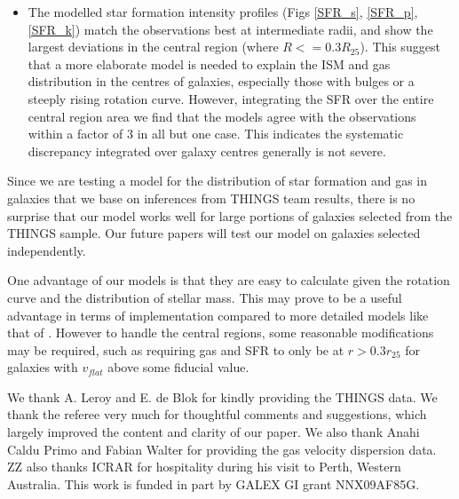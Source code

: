 \documentclass[12pt,preprint]{aastex}
\begin{document}
\begin{itemize}
\item The modelled star formation intensity profiles (Figs \ref{SFR_s}, \ref{SFR_p}, \ref{SFR_k}) match the observations best at intermediate radii, and show the largest deviations in the central region (where $R <= 0.3 R_{25}$).  
This suggest that a more elaborate model is needed to explain the ISM and gas
distribution in the centres of galaxies, especially those with bulges or a steeply rising rotation
curve. However, integrating the SFR over the entire central region area we find that the models agree with the observations within a factor of 3 in all but one case.  This indicates the systematic discrepancy integrated over  galaxy centres generally is not severe.

\end{itemize}

Since we are testing a model for the distribution of star formation and gas in galaxies that we base on inferences from THINGS team results, there is no surprise that our model works well for large portions of galaxies selected from the THINGS sample. Our future papers will test our model on galaxies selected independently.


One advantage of our models is that they are easy to calculate given the rotation curve and the distribution of stellar mass. This may prove to be a useful advantage in terms of implementation compared to  more detailed models like that of \citet{ost10}. However to handle the central regions, some reasonable modifications may be required, such as requiring gas and SFR to only be at  $r > 0.3r_{25}$ for galaxies with $v_{flat}$ above some fiducial value. 







\acknowledgments
We thank A. Leroy and E. de Blok for kindly providing the THINGS data. 
We thank the referee very much for thoughtful comments and suggestions, 
which largely improved the content and clarity of our paper.
We also thank Anahi Caldu Primo and Fabian Walter for  providing the gas velocity dispersion data. 
ZZ also thanks ICRAR for hospitality during his visit to Perth, Western Australia.  
This work is funded in part by GALEX GI grant NNX09AF85G. 
\end{document}
